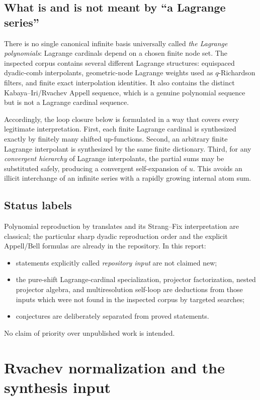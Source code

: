 \documentclass[11pt,oneside]{article}
\numberwithin{equation}{section}
\theoremstyle{definition}
\theoremstyle{remark}
\begin{document}
\subsection{What is and is not meant by ``a Lagrange series''}
There is no single canonical infinite basis universally called \emph{the Lagrange
polynomials}: Lagrange cardinals depend on a chosen finite node set.  The inspected
corpus contains several different Lagrange structures: equispaced dyadic-comb
interpolants, geometric-node Lagrange weights used as \(q\)-Richardson filters,
and finite exact interpolation identities.  It also contains the distinct
Kabaya--Iri/Rvachev Appell sequence, which is a genuine polynomial sequence but is
not a Lagrange cardinal sequence.

Accordingly, the loop closure below is formulated in a way that covers every
legitimate interpretation.  First, each finite Lagrange cardinal is synthesized
exactly by finitely many shifted up-functions.  Second, an arbitrary finite
Lagrange interpolant is synthesized by the same finite dictionary.  Third, for any
\emph{convergent hierarchy} of Lagrange interpolants, the partial sums may be
substituted safely, producing a convergent self-expansion of \(u\).  This avoids an
illicit interchange of an infinite series with a rapidly growing internal atom
sum.

\subsection{Status labels}
Polynomial reproduction by translates and its Strang--Fix interpretation are
classical; the particular sharp dyadic reproduction order and the explicit
Appell/Bell formulas are already in the repository.  In this report:
\begin{itemize}
\item statements explicitly called \emph{repository input} are not claimed new;
\item the pure-shift Lagrange-cardinal specialization, projector factorization,
      nested projector algebra, and multiresolution self-loop are deductions from
      those inputs which were not found in the inspected corpus by targeted
      searches;
\item conjectures are deliberately separated from proved statements.
\end{itemize}
No claim of priority over unpublished work is intended.

\section{Rvachev normalization and the synthesis input}
\label{sec:input}
\end{document}
